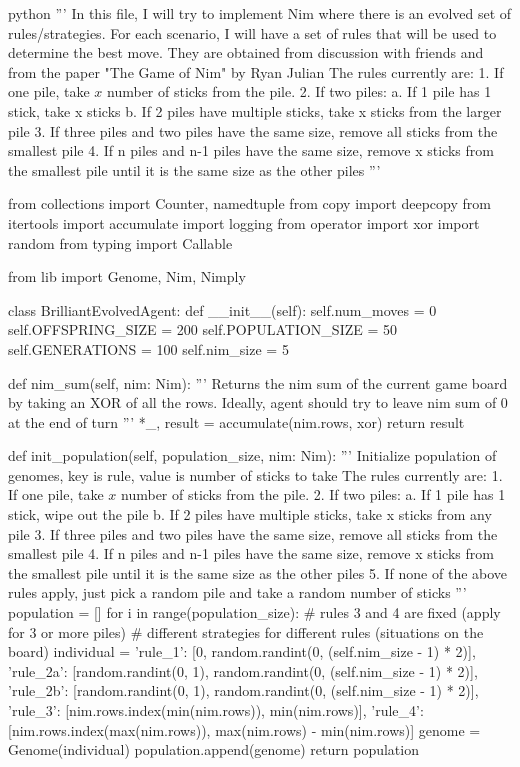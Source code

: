\begin{mintedbox}{python}
    '''
In this file, I will try to implement Nim where there is an evolved set of rules/strategies.
For each scenario, I will have a set of rules that will be used to determine the best move.
They are obtained from discussion with friends and from the paper "The Game of Nim" by Ryan Julian
The rules currently are:
1. If one pile, take $x$ number of sticks from the pile.
2. If two piles:
    a. If 1 pile has 1 stick, take x sticks
    b. If 2 piles have multiple sticks, take x sticks from the larger pile
3. If three piles and two piles have the same size, remove all sticks from the smallest pile
4. If n piles and n-1 piles have the same size, remove x sticks from the smallest pile until it is the same size as the other piles
'''

from collections import Counter, namedtuple
from copy import deepcopy
from itertools import accumulate
import logging
from operator import xor
import random
from typing import Callable

from lib import Genome, Nim, Nimply

class BrilliantEvolvedAgent:
    def __init__(self):
        self.num_moves = 0
        self.OFFSPRING_SIZE = 200
        self.POPULATION_SIZE = 50
        self.GENERATIONS = 100
        self.nim_size = 5

    def nim_sum(self, nim: Nim):
        '''
        Returns the nim sum of the current game board
        by taking an XOR of all the rows.
        Ideally, agent should try to leave nim sum of 0 at the end of turn
        '''
        *_, result = accumulate(nim.rows, xor)
        return result

    def init_population(self, population_size, nim: Nim):
        '''
        Initialize population of genomes,
        key is rule, value is number of sticks to take
        The rules currently are:
        1. If one pile, take $x$ number of sticks from the pile.
        2. If two piles:
            a. If 1 pile has 1 stick, wipe out the pile
            b. If 2 piles have multiple sticks, take x sticks from any pile
        3. If three piles and two piles have the same size, remove all sticks from the smallest pile
        4. If n piles and n-1 piles have the same size, remove x sticks from the smallest pile until it is the same size as the other piles
        5. If none of the above rules apply, just pick a random pile and take a random number of sticks
        '''
        population = []
        for i in range(population_size):
            # rules 3 and 4 are fixed (apply for 3 or more piles)
            # different strategies for different rules (situations on the board)
            individual = {
                'rule_1': [0, random.randint(0, (self.nim_size - 1) * 2)],
                'rule_2a': [random.randint(0, 1), random.randint(0, (self.nim_size - 1) * 2)],
                'rule_2b': [random.randint(0, 1), random.randint(0, (self.nim_size - 1) * 2)],
                'rule_3': [nim.rows.index(min(nim.rows)), min(nim.rows)],
                'rule_4': [nim.rows.index(max(nim.rows)), max(nim.rows) - min(nim.rows)]
            }
            genome = Genome(individual)
            population.append(genome)
        return population


\end{mintedbox}
